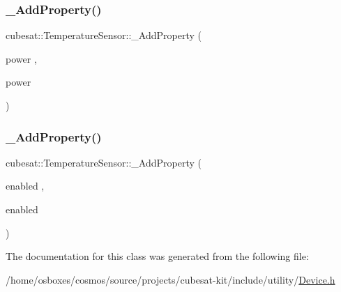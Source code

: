 \mbox{\label{classcubesat_1_1TemperatureSensor_ab8263308c1d38e54f866e35532e22122}} 
\subsubsection{\texorpdfstring{\+\_\+\+Add\+Property()}{\_AddProperty()}\hspace{0.1cm}{\footnotesize\ttfamily [5/6]}}
{\footnotesize\ttfamily cubesat\+::\+Temperature\+Sensor\+::\+\_\+\+Add\+Property (\begin{DoxyParamCaption}\item[{power}]{,  }\item[{power}]{ }\end{DoxyParamCaption})}

\mbox{\label{classcubesat_1_1TemperatureSensor_a38ae449b0d314d5ee899e7efc7744b79}} 
\subsubsection{\texorpdfstring{\+\_\+\+Add\+Property()}{\_AddProperty()}\hspace{0.1cm}{\footnotesize\ttfamily [6/6]}}
{\footnotesize\ttfamily cubesat\+::\+Temperature\+Sensor\+::\+\_\+\+Add\+Property (\begin{DoxyParamCaption}\item[{enabled}]{,  }\item[{enabled}]{ }\end{DoxyParamCaption})}



The documentation for this class was generated from the following file\+:\begin{DoxyCompactItemize}
\item 
/home/osboxes/cosmos/source/projects/cubesat-\/kit/include/utility/\hyperlink{Device_8h}{Device.\+h}\end{DoxyCompactItemize}
